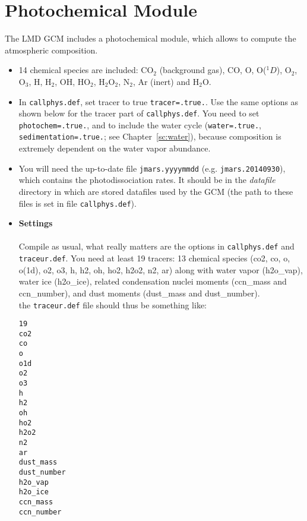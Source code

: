 \chapter{Photochemical Module}

\label{sc:photochem}

The LMD GCM includes a photochemical module, which allows to compute 
the atmospheric composition.

\begin{itemize}

\item 14 chemical species are included: CO$_2$ (background gas), CO, O, 
O({\em $^1D$}), O$_2$, O$_3$, H, H$_2$, OH, HO$_2$, H$_2$O$_2$, N$_2$,
Ar (inert) and H$_2$O.

\item In {\tt callphys.def}, set tracer to true {\tt tracer=.true.}.
Use the same options as shown below for the tracer part of {\tt callphys.def}.
You need to set {\tt photochem=.true.}, 
and to include the water cycle ({\tt water=.true.},
{\tt sedimentation=.true.}; see Chapter~\ref{sc:water}), because 
composition is extremely dependent on the water vapor abundance.
%

\item You will need the up-to-date file {\tt jmars.yyyymmdd} 
(e.g. {\tt jmars.20140930}), which contains the photodissociation rates.
It should be in the {\it datafile} directory in which are stored
datafiles used by the GCM (the path to these files is set in file
{\tt callphys.def}).

\item {\bf Settings} \\ \\
Compile as usual, what really matters are the options in {\tt callphys.def}
and {\tt traceur.def}.
You need at least 19 tracers:
13 chemical species (co2, co, o, o(1d), o2, o3, h, h2, oh, ho2, h2o2, n2, ar)
along with water vapor (h2o\_vap), water ice (h2o\_ice), related condensation
nuclei moments (ccn\_mass and ccn\_number), and dust moments
(dust\_mass and dust\_number).\\
the {\tt traceur.def} file should thus be something like:
\begin{verbatim}
19
co2
co
o
o1d
o2
o3
h
h2
oh
ho2
h2o2
n2
ar
dust_mass
dust_number
h2o_vap
h2o_ice
ccn_mass
ccn_number
\end{verbatim}



\end{itemize}
